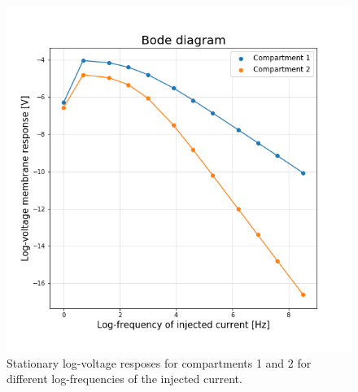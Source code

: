 \documentclass[12pt]{article}
\begin{document}
\begin{enumerate}
\begin{figure}[h]
    \centering
    \includegraphics[width=\textwidth]{Bode.png}
    \caption{Stationary log-voltage resposes for compartments 1 and 2 for different log-frequencies of the injected current.}
\end{figure}
\end{enumerate}
\end{document}
